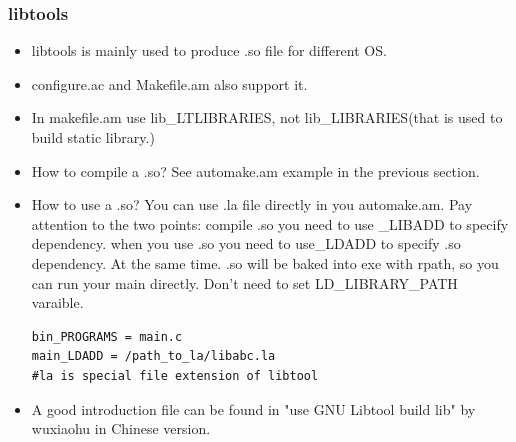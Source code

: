 \documentclass[a4paper,12pt,twoside]{book}
\begin{document}
\subsubsection{libtools}
\begin{itemize}
\item libtools is mainly used to produce .so file for different OS.
\item configure.ac and Makefile.am also support it.

\item In makefile.am use lib\_LTLIBRARIES, not lib\_LIBRARIES(that is used to build static library.)

\item How to compile a .so? See automake.am example in the previous section.
\item How to use a .so? You can use .la file directly in you automake.am. Pay attention to the two points: compile .so you need to use \_LIBADD to specify dependency. when you use .so you need to use\_LDADD to specify .so dependency. At the same time. .so will be baked into exe with rpath, so you can run your main directly. Don't need to set LD\_LIBRARY\_PATH varaible.
\begin{verbatim}
bin_PROGRAMS = main.c
main_LDADD = /path_to_la/libabc.la 
#la is special file extension of libtool
\end{verbatim}

\item A good introduction file can be found in "use GNU Libtool build lib" by wuxiaohu in Chinese version.

\end{itemize}
\end{document}
